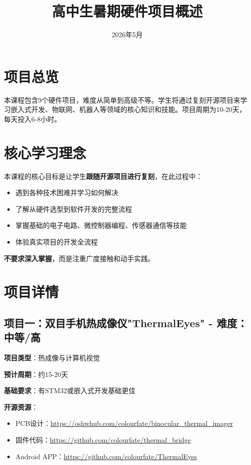 \documentclass[12pt,a4paper]{article}
\title{高中生暑期硬件项目概述}
\author{}
\date{2026年5月}
\begin{document}
\maketitle

\section{项目总览}

本课程包含9个硬件项目，难度从简单到高级不等。学生将通过复刻开源项目来学习嵌入式开发、物联网、机器人等领域的核心知识和技能。项目周期为10-20天，每天投入6-8小时。

\section{核心学习理念}

本课程的核心目标是让学生\textbf{跟随开源项目进行复刻}，在此过程中：
\begin{itemize}
    \item 遇到各种技术困难并学习如何解决
    \item 了解从硬件选型到软件开发的完整流程
    \item 掌握基础的电子电路、微控制器编程、传感器通信等技能
    \item 体验真实项目的开发全流程
\end{itemize}

\textbf{不要求深入掌握}，而是注重广度接触和动手实践。

\newpage

\section{项目详情}

\subsection{项目一：双目手机热成像仪"ThermalEyes" - 难度：中等/高}

\textbf{项目类型}：热成像与计算机视觉

\textbf{预计周期}：约15-20天

\textbf{基础要求}：有STM32或嵌入式开发基础更佳

\textbf{开源资源}：
\begin{itemize}
    \item PCB设计：\url{https://oshwhub.com/colourfate/binocular_thermal_imager}
    \item 固件代码：\url{https://github.com/colourfate/thermal_bridge}
    \item Android APP：\url{https://github.com/colourfate/ThermalEyes}
\end{itemize}
\end{document}
